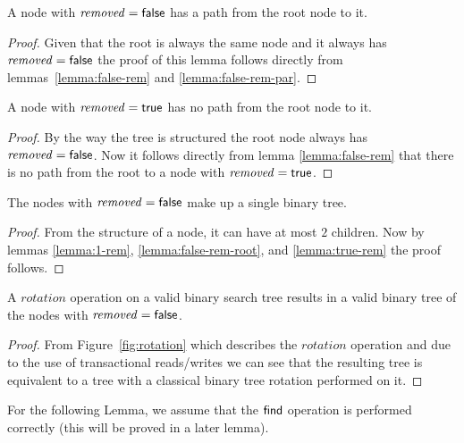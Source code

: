 \begin{lemma}
\label{lemma:false-rem-root}
A node with $\ms{removed}=\lit{false}$ has a path from the root node to it.
\end{lemma}
\begin{proof}
Given that the root is always the same node and it always has $\ms{removed}=\lit{false}$ the proof of this lemma follows directly
from lemmas~\ref{lemma:false-rem} and \ref{lemma:false-rem-par}.
\end{proof}


\begin{lemma}
\label{lemma:true-rem}
A node with $\ms{removed}=\lit{true}$ has no path from the root node to it.
\end{lemma}
\begin{proof}
By the way the tree is structured the root node always has $\ms{removed}=\lit{false}$.
Now it follows directly from lemma \ref{lemma:false-rem} that there is no path from the root to a node with $\ms{removed}=\lit{true}$.
\end{proof}


\begin{lemma}
\label{lemma:binary-tree}
The nodes with $\ms{removed}=\lit{false}$ make up a single binary tree.
\end{lemma}
\begin{proof}
From the structure of a node, it can have at most $2$ children.
Now by lemmas \ref{lemma:1-rem}, \ref{lemma:false-rem-root}, and \ref{lemma:true-rem} the proof follows.
\end{proof}



\begin{lemma}
\label{lemma:rotation-valid}
A $rotation$ operation on a valid binary search tree results in a valid binary tree of the nodes with $\ms{removed}=\lit{false}$.
\end{lemma}
\begin{proof}
From Figure~\ref{fig:rotation} which describes the $rotation$ operation and due to the use of transactional reads/writes
we can see that the resulting tree is equivalent to a tree with a classical binary tree rotation performed on it.
\end{proof}


For the following Lemma, we assume that the $\act{find}$ operation is performed correctly (this will be proved in a later lemma).

